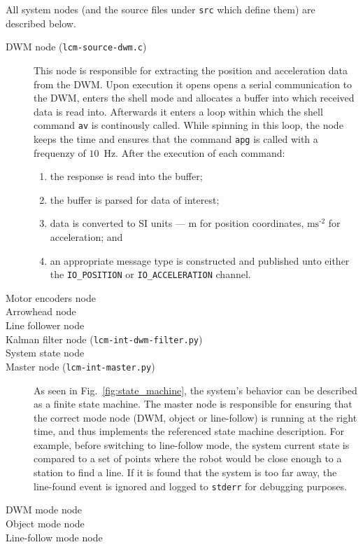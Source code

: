 All system nodes (and the source files under \texttt{src} which define them) are described below.
\begin{description}
\item[DWM node (\texttt{lcm-source-dwm.c})]
This node is responsible for extracting the position and acceleration data from the DWM.
Upon execution it opens opens a serial communication to the DWM, enters the shell mode and allocates a buffer into which received data is read into.
Afterwards it enters a loop within which the shell command \texttt{av} is continously called.
While spinning in this loop, the node keeps the time and ensures that the command \texttt{apg} is called with a frequenzy of $10$~Hz.
After the execution of each command:
\begin{enumerate}
  \item the response is read into the buffer;
  \item the buffer is parsed for data of interest;
  \item data is converted to SI units --- m for position coordinates, $\text{ms}^{\text{-2}}$ for acceleration; and
  \item an appropriate message type is constructed and published unto either the \texttt{IO\_POSITION} or \texttt{IO\_ACCELERATION} channel.
\end{enumerate}

\item[Motor encoders node]

\item[Arrowhead node]

\item[Line follower node]

\item[Kalman filter node (\texttt{lcm-int-dwm-filter.py})]

\item[System state node]

\item[Master node (\texttt{lcm-int-master.py})]
  As seen in Fig.~\ref{fig:state_machine}, the system's behavior can be described as a finite state machine.
  The master node is responsible for ensuring that the correct mode node (DWM, object or line-follow) is running at the right time,
  and thus implements the referenced state machine description.
  For example, before switching to line-follow mode, the system current state is compared to a set of points where the robot would be close enough to a station to find a line.
  If it is found that the system is too far away, the line-found event is ignored and logged to \texttt{stderr} for debugging purposes.

\item[DWM mode node]

\item[Object mode node]

\item[Line-follow mode node]

\end{description}

